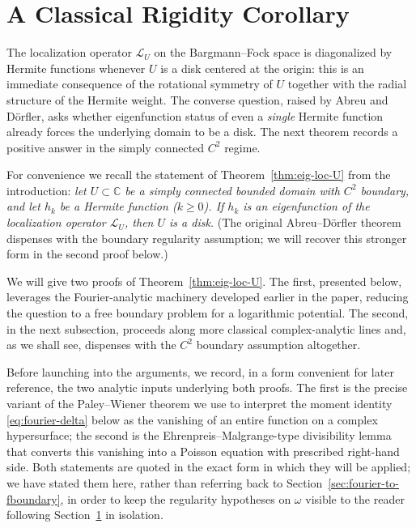 \documentclass[a4paper,11pt,reqno]{amsart}
\numberwithin{equation}{section}
\theoremstyle{plain} %
\theoremstyle{definition} %
\theoremstyle{remark}
\newcommand{\C}{\mathbb{C}}
\begin{document}
\section{A Classical Rigidity Corollary}\label{sec:classical-rigidity}

The localization operator $\mathcal{L}_U$ on the Bargmann--Fock space is
diagonalized by Hermite functions whenever $U$ is a disk centered at the
origin: this is an immediate consequence of the rotational symmetry of $U$
together with the radial structure of the Hermite weight. The converse
question, raised by Abreu and D\"orfler, asks whether eigenfunction status of
even a \emph{single} Hermite function already forces the underlying domain to
be a disk. The next theorem records a positive answer in the simply connected
$C^2$ regime.

For convenience we recall the statement of Theorem~\ref{thm:eig-loc-U} from the introduction:
\emph{let $U\subset \C$ be a simply connected bounded domain with $C^2$
boundary, and let $h_k$ be a Hermite function ($k\ge 0$). If $h_k$ is an
eigenfunction of the localization operator $\mathcal{L}_U$, then $U$ is a
disk.} (The original Abreu--D\"orfler theorem~\cite{Abreu-Doerfler} dispenses
with the boundary regularity assumption; we will recover this stronger form
in the second proof below.)

We will give two proofs of Theorem~\ref{thm:eig-loc-U}. The first, presented
below, leverages the Fourier-analytic machinery developed earlier in the
paper, reducing the question to a free boundary problem for a logarithmic
potential. The second, in the next subsection, proceeds along more
classical complex-analytic lines and, as we shall see, dispenses with the
$C^2$ boundary assumption altogether.

Before launching into the arguments, we record, in a form convenient for
later reference, the two analytic inputs underlying both proofs. The first is
the precise variant of the Paley--Wiener theorem we use to interpret the
moment identity \eqref{eq:fourier-delta} below as the vanishing of an entire
function on a complex hypersurface; the second is the
Ehrenpreis--Malgrange-type divisibility lemma that converts this vanishing
into a Poisson equation with prescribed right-hand side. Both statements are
quoted in the exact form in which they will be applied; we have stated them
here, rather than referring back to Section~\ref{sec:fourier-to-fboundary},
in order to keep the regularity hypotheses on $\omega$ visible to the
reader following Section~\ref{sec:classical-rigidity} in isolation.
\end{document}
